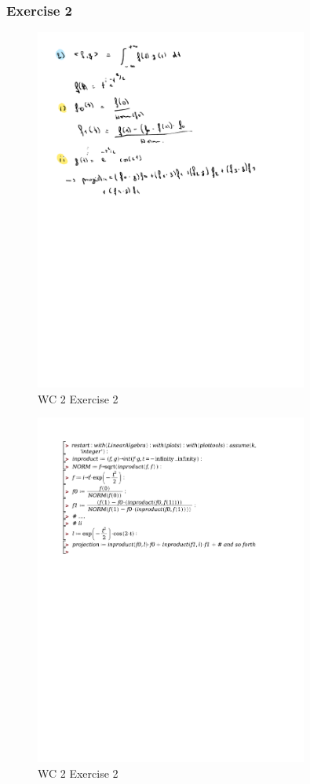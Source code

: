 \documentclass[a4paper]{report}
\begin{document}
\subsubsection{Exercise 2}

\begin{figure}[H]
	\centering
	\includegraphics[width=0.8\textwidth]{assets/wc_2_ex_2.pdf}
	\caption{WC 2 Exercise 2}
	\label{fig:wc_2_ex_2}
\end{figure}

\begin{figure}[H]
	\centering
	\includegraphics[width=0.8\textwidth]{exercises/wc_2_ex_2.pdf}
	\caption{WC 2 Exercise 2}
	\label{fig:wc_2_ex_2}
\end{figure}
\end{document}
